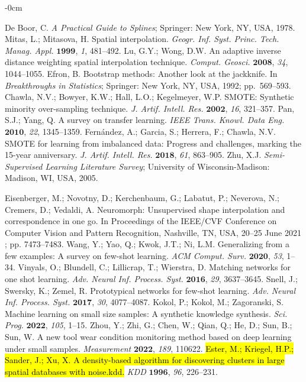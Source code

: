 \documentclass[mathematics,article,accept,pdftex,moreauthors]{Definitions/mdpi}
\begin{document}
\begin{adjustwidth}{-\extralength}{0cm}


 
\begin{thebibliography}{999}
De Boor, C. \emph{A Practical Guide to Splines};  Springer: New York, NY, USA, 1978.
Mitas, L.; Mitasova, H. Spatial interpolation. \emph{Geogr. Inf. Syst. Princ. Tech. Manag. Appl.} $\bm{1999}$, \emph{1}, 481--492.
Lu, G.Y.; Wong, D.W. An adaptive inverse distance weighting spatial interpolation technique. \emph{Comput. Geosci.} $\bm{2008}$, \emph{34}, 1044--1055.
Efron, B. Bootstrap methods: Another look at the jackknife. In \emph{Breakthroughs in Statistics}; Springer: New York, NY,  USA, 1992; \mbox{pp. 569--593}.
Chawla, N.V.; Bowyer, K.W.; Hall, L.O.; Kegelmeyer, W.P. SMOTE: Synthetic minority over-sampling technique. \emph{J. Artif. Intell. Res.} $\bm{2002}$, \emph{16}, 321--357.
Pan, S.J.; Yang, Q. A survey on transfer learning. \emph{IEEE Trans. Knowl. Data Eng.} $\bm{2010}$, \emph{22}, 1345--1359.
Fernández, A.; Garcia, S.; Herrera, F.; Chawla, N.V.  SMOTE for learning from imbalanced data: Progress and challenges, marking the 15-year anniversary. \emph{J. Artif. Intell. Res.} $\bm{2018}$, \emph{61}, 863--905.
Zhu, X.J. \emph{Semi-Supervised Learning Literature Survey};  University of Wisconsin-Madison:   Madison, WI, USA, {{2005}}.  

 Eisenberger, M.; Novotny, D.; Kerchenbaum, G.;  Labatut, P.; Neverova, N.; Cremers, D.;  Vedaldi, A. Neuromorph: Unsupervised shape interpolation and correspondence in one go. In Proceedings of the IEEE/CVF Conference on Computer Vision and Pattern Recognition, {Nashville, TN, USA, 20--25 June  2021}
; pp. 7473--7483.
	Wang, Y.; Yao, Q.; Kwok, J.T.; Ni, L.M. Generalizing from a few examples: A survey on few-shot learning. \emph{ACM Comput. Surv.} $\bm{2020}$, \emph{53}, 1--34.
 Vinyals, O.; Blundell, C.; Lillicrap, T.;  Wierstra, D. Matching networks for one shot learning. \emph{Adv. Neural Inf. Process. Syst.} $\bm{2016}$, \emph{29}, 3637--3645.
 Snell, J.; Swersky, K.; Zemel, R. Prototypical networks for few-shot learning. \emph{Adv. Neural Inf. Process. Syst.} $\bm{2017}$, \emph{30}, 4077--4087.
	Kokol, P.; Kokol, M.; Zagoranski, S. Machine learning on small size samples: A synthetic knowledge synthesis. \emph{Sci. Prog.} $\bm{2022}$, \emph{105}, 1--15.
 Zhou, Y.; Zhi, G.; Chen, W.; Qian, Q.; He, D.; Sun, B.;  Sun, W. A new tool wear condition monitoring method based on deep learning under small samples. \emph{Measurement} $\bm{2022}$, \emph{189}, 110622.
 \hl{Ester, M.; Kriegel, H.P.; Sander, J.; Xu, X. A density-based algorithm for discovering clusters in large spatial databases with noise.kdd.} \emph{{KDD} 
}  $\bm{1996}$, \emph{96}, 226--231. %
\end{thebibliography}	

\PublishersNote{}
\end{adjustwidth}
\end{document}

